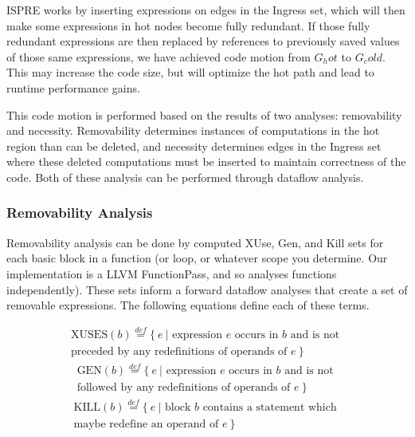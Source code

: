 \documentclass[sigplan,screen]{acmart}
\begin{document}
    ISPRE works by inserting expressions on edges in the Ingress set, which will then make some expressions in hot nodes become fully redundant. If those fully redundant expressions are then replaced by references to previously saved values of those same expressions, we have achieved code motion from $G_hot$ to $G_cold$. This may increase the code size, but will optimize the hot path and lead to runtime performance gains.

    This code motion is performed based on the results of two analyses: removability and necessity. Removability determines instances of computations in the hot region than can be deleted, and necessity determines edges in the Ingress set where these deleted computations must be inserted to maintain correctness of the code. Both of these analysis can be performed through dataflow analysis. 

    \subsubsection{Removability Analysis}

    Removability analysis can be done by computed XUse, Gen, and Kill sets for each basic block in a function (or loop, or whatever scope you determine. Our implementation is a LLVM FunctionPass, and so analyses functions independently). These sets inform a forward dataflow analyses that create a set of removable expressions. The following equations define each of these terms. 
    
    \begin{multline*}
    \textrm{XUSES}(b) \overset{def}{=} \{\ e\ | \textrm{ expression } e \textrm{ occurs in } b \textrm{ and is not }\\ \textrm{preceded by any redefinitions of operands of } e\ \}
    \end{multline*}
    \begin{multline*}
    \textrm{GEN}(b) \overset{def}{=} \{\ e\ | \textrm{ expression } e \textrm{ occurs in } b \textrm{ and is not }\\ \textrm{followed by any redefinitions of operands of } e\ \}
    \end{multline*}    
    \begin{multline*}
    \textrm{KILL}(b) \overset{def}{=} \{\ e\ | \textrm{ block } b \textrm{ contains a statement which } \\ \textrm{maybe redefine an operand of } e\ \}
    \end{multline*}
     
\end{document}
